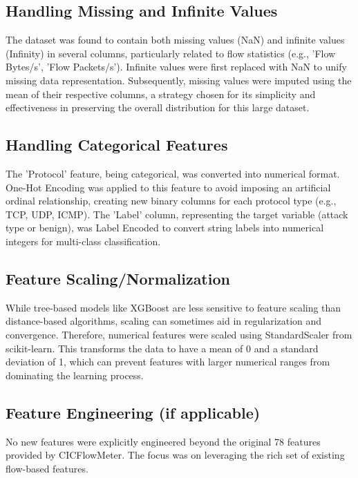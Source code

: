 \subsection{Handling Missing and Infinite Values} The dataset was found to contain both missing values (NaN) and infinite values (Infinity) in several columns, particularly related to flow statistics (e.g., 'Flow Bytes/s', 'Flow Packets/s'). Infinite values were first replaced with NaN to unify missing data representation. Subsequently, missing values were imputed using the mean of their respective columns, a strategy chosen for its simplicity and effectiveness in preserving the overall distribution for this large dataset.

\subsection{Handling Categorical Features}
The 'Protocol' feature, being categorical, was converted into numerical format. One-Hot Encoding was applied to this feature to avoid imposing an artificial ordinal relationship, creating new binary columns for each protocol type (e.g., TCP, UDP, ICMP). The 'Label' column, representing the target variable (attack type or benign), was Label Encoded to convert string labels into numerical integers for multi-class classification.

\subsection{Feature Scaling/Normalization} 
While tree-based models like XGBoost are less sensitive to feature scaling than distance-based algorithms, scaling can sometimes aid in regularization and convergence. Therefore, numerical features were scaled using StandardScaler from scikit-learn. This transforms the data to have a mean of 0 and a standard deviation of 1, which can prevent features with larger numerical ranges from dominating the learning process.

\subsection{Feature Engineering (if applicable)}
No new features were explicitly engineered beyond the original 78 features provided by CICFlowMeter. The focus was on leveraging the rich set of existing flow-based features.

